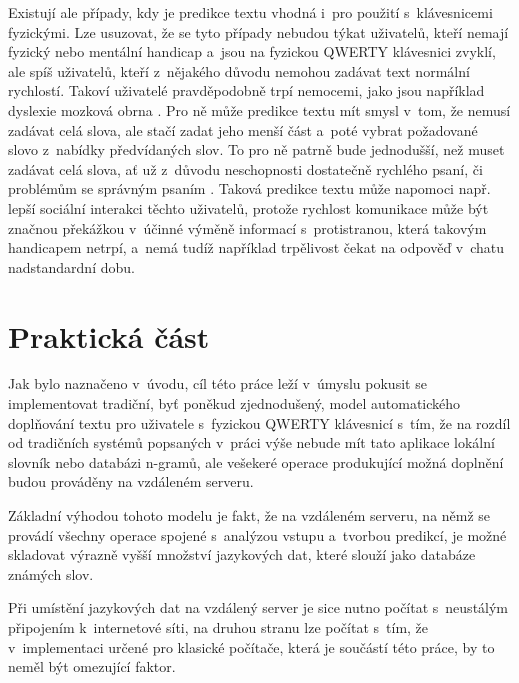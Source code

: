 \documentclass[a4paper,11pt,openany]{book} %
\begin{document}
Existují ale případy, kdy je predikce textu vhodná i~pro použití s~klávesnicemi fyzickými. Lze usuzovat, že se tyto případy nebudou týkat uživatelů, kteří nemají fyzický nebo mentální handicap a~jsou na fyzickou QWERTY klávesnici zvyklí, ale spíš uživatelů, kteří z~nějakého důvodu nemohou zadávat text normální rychlostí. Takoví uživatelé pravděpodobně trpí nemocemi, jako jsou například dyslexie mozková obrna \parencite[1--2]{philgadomski}. Pro ně může predikce textu mít smysl v~tom, že nemusí zadávat celá slova, ale stačí zadat jeho menší část a~poté vybrat požadované slovo z~nabídky předvídaných slov. To pro ně patrně bude jednodušší, než muset zadávat celá slova, ať už z~důvodu neschopnosti dostatečně rychlého psaní, či problémům se správným psaním \parencite{penfriend2014}. %
Taková predikce textu může napomoci např. lepší sociální interakci těchto uživatelů, protože rychlost komunikace může být značnou překážkou v~účinné výměně informací s~protistranou, která takovým handicapem netrpí, a~nemá tudíž například trpělivost čekat na odpověď v~chatu nadstandardní dobu. %

\part{Praktická část}

Jak bylo naznačeno v~úvodu, cíl této práce leží v~úmyslu pokusit se implementovat tradiční, byť poněkud zjednodušený, model automatického doplňování textu pro uživatele s~fyzickou QWERTY klávesnicí s~tím, že na rozdíl od tradičních systémů popsaných v~práci výše nebude mít tato aplikace lokální slovník nebo databázi n-gramů, ale vešekeré operace produkující možná doplnění budou prováděny na vzdáleném serveru.

Základní výhodou tohoto modelu je fakt, že na vzdáleném serveru, na němž se provádí všechny operace spojené s~analýzou vstupu a~tvorbou predikcí, je možné skladovat výrazně vyšší množství jazykových dat, které slouží jako databáze známých slov.

Při umístění jazykových dat na vzdálený server je sice nutno počítat s~neustálým připojením k~internetové síti, na druhou stranu lze počítat s~tím, že v~implementaci určené pro klasické počítače, která je součástí této práce, by to neměl být omezující faktor. 
\end{document}
